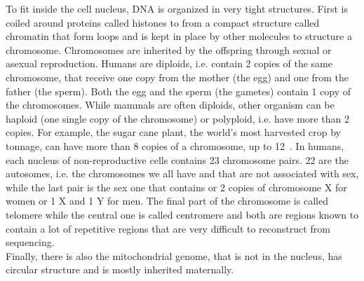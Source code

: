 To fit inside the cell nucleus, DNA is organized in very tight structures. First is coiled around proteins called histones to from a compact structure called chromatin that form loops and is kept in place by other molecules to structure a chromosome. Chromosomes are inherited by the offspring through sexual or asexual reproduction. Humans are diploids, i.e. contain 2 copies of the same chromosome, that receive one copy from the mother (the egg) and one from the father (the sperm). Both the egg and the sperm (the gametes) contain 1 copy of the chromosomes. While mammals are often diploids, other organism can be haploid (one single copy of the chromosome) or polyploid, i.e. have more than 2 copies. For example, the sugar cane plant, the world's most harvested crop by tonnage, can have more than 8 copies of a chromosome, up to 12~\cite{sugarcane}.
In humans, each nucleus of non-reproductive cells contains 23 chromosome pairs. 22 are the autosomes, i.e. the chromosomes we all have and that are not associated with sex, while the last pair is the sex one that contains or 2 copies of chromosome X for women or 1 X and 1 Y for men. The final part of the chromosome is called telomere while the central one is called centromere and both are regions known to contain a lot of repetitive regions that are very difficult to reconstruct from sequencing. \\ Finally, there is also the mitochondrial genome, that is not in the nucleus, has circular structure and is mostly inherited maternally.

